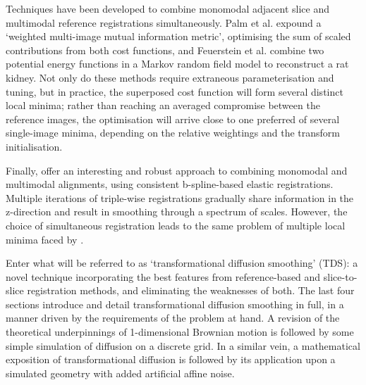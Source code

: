   Techniques have been developed to combine monomodal adjacent slice and multimodal reference registrations simultaneously. Palm et al. \cite{Palm2008} expound a `weighted multi-image mutual information metric', optimising the sum of scaled contributions from both cost functions, and Feuerstein et al. \cite{Feuerstein2011} combine two potential energy functions in a Markov random field model to reconstruct a rat kidney. Not only do these methods require extraneous parameterisation and tuning, but in practice, the superposed cost function will form several distinct local minima; rather than reaching an averaged compromise between the reference images, the optimisation will arrive close to one preferred of several single-image minima, depending on the relative weightings and the transform initialisation.
  
  Finally, \cite{Arganda-Carreras2010} offer an interesting and robust approach to combining monomodal and multimodal alignments, using consistent b-spline-based elastic registrations. Multiple iterations of triple-wise registrations gradually share information in the z-direction and result in smoothing through a spectrum of scales. However, the choice of simultaneous registration leads to the same problem of multiple local minima faced by \cite{Palm2008,Feuerstein2011}.
  
  Enter what will be referred to as `transformational diffusion smoothing' (TDS): a novel technique incorporating the best features from reference-based and slice-to-slice registration methods, and eliminating the weaknesses of both. The last four sections introduce and detail transformational diffusion smoothing in full, in a manner driven by the requirements of the problem at hand. A revision of the theoretical underpinnings of 1-dimensional Brownian motion is followed by some simple simulation of diffusion on a discrete grid. In a similar vein, a mathematical exposition of transformational diffusion is followed by its application upon a simulated geometry with added artificial affine noise.
  
  


